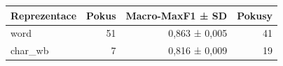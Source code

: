 \begin{tabular}{lrrr}
\toprule
Reprezentace & Pokus & Macro-MaxF1 ± SD & Pokusy\\
\midrule
word & 51 & 0,863 ± 0,005 & 41\\
char\_wb & 7 & 0,816 ± 0,009 & 19\\
\bottomrule
\end{tabular}
